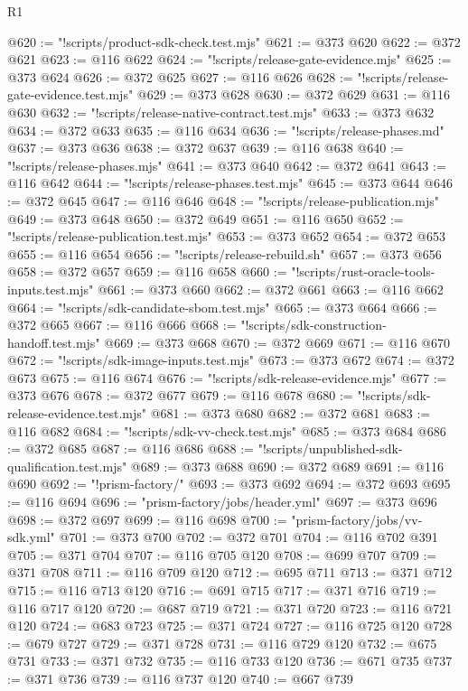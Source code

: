 \begin{lexlean}{R1}
\begin{coremodule}
@620 := "!scripts/product-sdk-check.test.mjs"
@621 := @373 @620
@622 := @372 @621
@623 := @116 @622
@624 := "!scripts/release-gate-evidence.mjs"
@625 := @373 @624
@626 := @372 @625
@627 := @116 @626
@628 := "!scripts/release-gate-evidence.test.mjs"
@629 := @373 @628
@630 := @372 @629
@631 := @116 @630
@632 := "!scripts/release-native-contract.test.mjs"
@633 := @373 @632
@634 := @372 @633
@635 := @116 @634
@636 := "!scripts/release-phases.md"
@637 := @373 @636
@638 := @372 @637
@639 := @116 @638
@640 := "!scripts/release-phases.mjs"
@641 := @373 @640
@642 := @372 @641
@643 := @116 @642
@644 := "!scripts/release-phases.test.mjs"
@645 := @373 @644
@646 := @372 @645
@647 := @116 @646
@648 := "!scripts/release-publication.mjs"
@649 := @373 @648
@650 := @372 @649
@651 := @116 @650
@652 := "!scripts/release-publication.test.mjs"
@653 := @373 @652
@654 := @372 @653
@655 := @116 @654
@656 := "!scripts/release-rebuild.sh"
@657 := @373 @656
@658 := @372 @657
@659 := @116 @658
@660 := "!scripts/rust-oracle-tools-inputs.test.mjs"
@661 := @373 @660
@662 := @372 @661
@663 := @116 @662
@664 := "!scripts/sdk-candidate-sbom.test.mjs"
@665 := @373 @664
@666 := @372 @665
@667 := @116 @666
@668 := "!scripts/sdk-construction-handoff.test.mjs"
@669 := @373 @668
@670 := @372 @669
@671 := @116 @670
@672 := "!scripts/sdk-image-inputs.test.mjs"
@673 := @373 @672
@674 := @372 @673
@675 := @116 @674
@676 := "!scripts/sdk-release-evidence.mjs"
@677 := @373 @676
@678 := @372 @677
@679 := @116 @678
@680 := "!scripts/sdk-release-evidence.test.mjs"
@681 := @373 @680
@682 := @372 @681
@683 := @116 @682
@684 := "!scripts/sdk-vv-check.test.mjs"
@685 := @373 @684
@686 := @372 @685
@687 := @116 @686
@688 := "!scripts/unpublished-sdk-qualification.test.mjs"
@689 := @373 @688
@690 := @372 @689
@691 := @116 @690
@692 := "!prism-factory/"
@693 := @373 @692
@694 := @372 @693
@695 := @116 @694
@696 := "prism-factory/jobs/header.yml"
@697 := @373 @696
@698 := @372 @697
@699 := @116 @698
@700 := "prism-factory/jobs/vv-sdk.yml"
@701 := @373 @700
@702 := @372 @701
@704 := @116 @702 @391
@705 := @371 @704
@707 := @116 @705 @120
@708 := @699 @707
@709 := @371 @708
@711 := @116 @709 @120
@712 := @695 @711
@713 := @371 @712
@715 := @116 @713 @120
@716 := @691 @715
@717 := @371 @716
@719 := @116 @717 @120
@720 := @687 @719
@721 := @371 @720
@723 := @116 @721 @120
@724 := @683 @723
@725 := @371 @724
@727 := @116 @725 @120
@728 := @679 @727
@729 := @371 @728
@731 := @116 @729 @120
@732 := @675 @731
@733 := @371 @732
@735 := @116 @733 @120
@736 := @671 @735
@737 := @371 @736
@739 := @116 @737 @120
@740 := @667 @739

\end{coremodule}
\end{lexlean}

